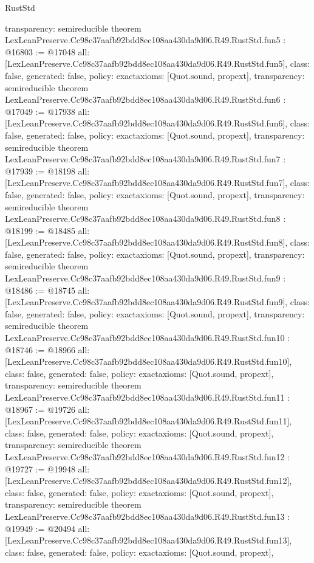 \begin{lexlean}{RustStd}
\begin{coremodule}
{  transparency: semireducible
}
theorem LexLeanPreserve.Cc98c37aafb92bdd8ec108aa430da9d06.R49.RustStd.fun5 : @16803 := @17048 {
  all: [LexLeanPreserve.Cc98c37aafb92bdd8ec108aa430da9d06.R49.RustStd.fun5],
  class: false,
  generated: false,
  policy: exact{axioms: [Quot.sound, propext]},
  transparency: semireducible
}
theorem LexLeanPreserve.Cc98c37aafb92bdd8ec108aa430da9d06.R49.RustStd.fun6 : @17049 := @17938 {
  all: [LexLeanPreserve.Cc98c37aafb92bdd8ec108aa430da9d06.R49.RustStd.fun6],
  class: false,
  generated: false,
  policy: exact{axioms: [Quot.sound, propext]},
  transparency: semireducible
}
theorem LexLeanPreserve.Cc98c37aafb92bdd8ec108aa430da9d06.R49.RustStd.fun7 : @17939 := @18198 {
  all: [LexLeanPreserve.Cc98c37aafb92bdd8ec108aa430da9d06.R49.RustStd.fun7],
  class: false,
  generated: false,
  policy: exact{axioms: [Quot.sound, propext]},
  transparency: semireducible
}
theorem LexLeanPreserve.Cc98c37aafb92bdd8ec108aa430da9d06.R49.RustStd.fun8 : @18199 := @18485 {
  all: [LexLeanPreserve.Cc98c37aafb92bdd8ec108aa430da9d06.R49.RustStd.fun8],
  class: false,
  generated: false,
  policy: exact{axioms: [Quot.sound, propext]},
  transparency: semireducible
}
theorem LexLeanPreserve.Cc98c37aafb92bdd8ec108aa430da9d06.R49.RustStd.fun9 : @18486 := @18745 {
  all: [LexLeanPreserve.Cc98c37aafb92bdd8ec108aa430da9d06.R49.RustStd.fun9],
  class: false,
  generated: false,
  policy: exact{axioms: [Quot.sound, propext]},
  transparency: semireducible
}
theorem LexLeanPreserve.Cc98c37aafb92bdd8ec108aa430da9d06.R49.RustStd.fun10 : @18746 := @18966 {
  all: [LexLeanPreserve.Cc98c37aafb92bdd8ec108aa430da9d06.R49.RustStd.fun10],
  class: false,
  generated: false,
  policy: exact{axioms: [Quot.sound, propext]},
  transparency: semireducible
}
theorem LexLeanPreserve.Cc98c37aafb92bdd8ec108aa430da9d06.R49.RustStd.fun11 : @18967 := @19726 {
  all: [LexLeanPreserve.Cc98c37aafb92bdd8ec108aa430da9d06.R49.RustStd.fun11],
  class: false,
  generated: false,
  policy: exact{axioms: [Quot.sound, propext]},
  transparency: semireducible
}
theorem LexLeanPreserve.Cc98c37aafb92bdd8ec108aa430da9d06.R49.RustStd.fun12 : @19727 := @19948 {
  all: [LexLeanPreserve.Cc98c37aafb92bdd8ec108aa430da9d06.R49.RustStd.fun12],
  class: false,
  generated: false,
  policy: exact{axioms: [Quot.sound, propext]},
  transparency: semireducible
}
theorem LexLeanPreserve.Cc98c37aafb92bdd8ec108aa430da9d06.R49.RustStd.fun13 : @19949 := @20494 {
  all: [LexLeanPreserve.Cc98c37aafb92bdd8ec108aa430da9d06.R49.RustStd.fun13],
  class: false,
  generated: false,
  policy: exact{axioms: [Quot.sound, propext]},
}
\end{coremodule}
\end{lexlean}
